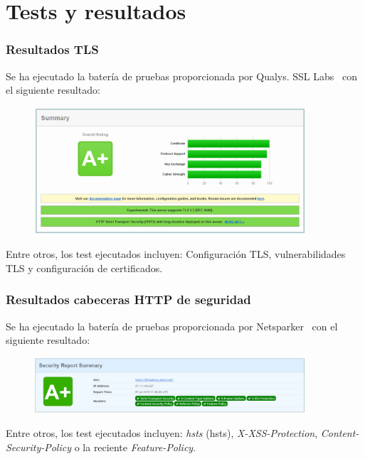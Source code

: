 \section{Tests y resultados}
\begin{frame}[shrink]
  \frametitle{Resultados TLS}
  Se ha ejecutado la batería de pruebas proporcionada por Qualys. SSL Labs~\cite{ssllabs} con el siguiente resultado:
  \begin{figure}
    \includegraphics[width=0.9\textwidth]{fig/SSLTLS_Report_Summary}
  \end{figure}
  Entre otros, los test ejecutados incluyen: Configuración TLS, vulnerabilidades TLS y configuración de certificados.
\end{frame}

\begin{frame}[shrink]
  \frametitle{Resultados cabeceras HTTP de seguridad}
  Se ha ejecutado la batería de pruebas proporcionada por Netsparker~\cite{securityheaders} con el siguiente resultado:
  \begin{figure}
    \includegraphics[width=0.9\textwidth]{fig/SecurityHeaders_Report_Summary}
  \end{figure}
  Entre otros, los test ejecutados incluyen: {\em \acrlong{hsts}} (\acrshort{hsts}), {\em X-XSS-Protection}, {\em Content-Security-Policy} o la reciente {\em Feature-Policy}.
\end{frame}


